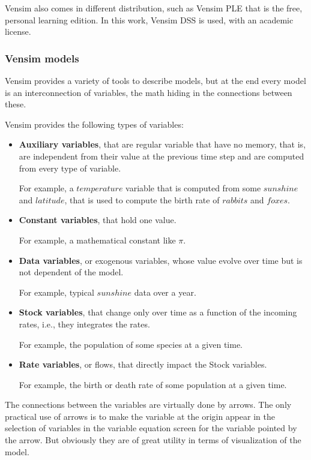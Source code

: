 Vensim also comes in different distribution, such as Vensim PLE that is the free, personal learning edition. In this work, Vensim DSS is used, with an academic license.


\subsubsection{Vensim models}

Vensim provides a variety of tools to describe models, but at the end every model is an interconnection of variables, the math hiding in the connections between these. 

Vensim provides the following types of variables:
\begin{itemize}
    \item \textbf{Auxiliary variables}, that are regular variable that have no memory, that is, are independent from their value at the previous time step and are computed from every type of variable.

    For example, a $temperature$ variable that is computed from some $sunshine$ and $latitude$, that is used to compute the birth rate of $rabbits$ and $foxes$.

    \item \textbf{Constant variables}, that hold one value.
    
    For example, a mathematical constant like $\pi$.

    \item \textbf{Data variables}, or exogenous variables, whose value evolve over time but is not dependent of the model.

    For example, typical $sunshine$ data over a year.

    \item \textbf{Stock variables}, that change only over time as a function of the incoming rates, i.e., they integrates the rates.

    For example, the population of some species at a given time.

    \item \textbf{Rate variables}, or flows, that directly impact the Stock variables. 

    For example, the birth or death rate of some population at a given time.
\end{itemize}

The connections between the variables are virtually done by arrows. The only practical use of arrows is to make the variable at the origin appear in the selection of variables in the variable equation screen for the variable pointed by the arrow. But obviously they are of great utility in terms of visualization of the model.

